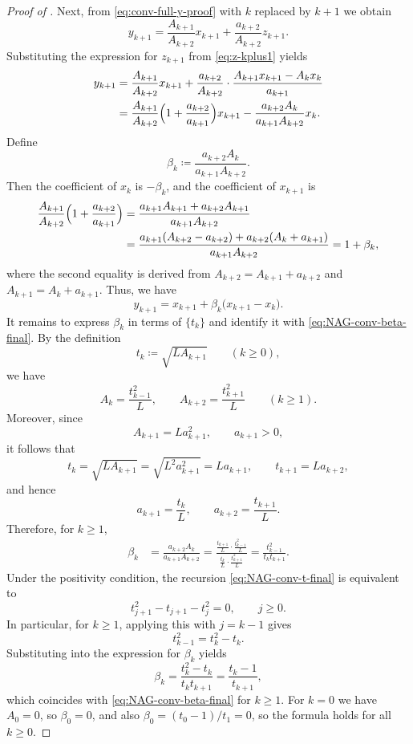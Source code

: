 \documentclass[10pt]{article}
\begin{document}
\begin{proof}[Proof of ]
Next, from \eqref{eq:conv-full-y-proof} with $k$ replaced by $k+1$ we obtain
\[
y_{k+1}
=
\frac{A_{k+1}}{A_{k+2}}x_{k+1}
+
\frac{a_{k+2}}{A_{k+2}}z_{k+1}.
\]
Substituting the expression for $z_{k+1}$ from \eqref{eq:z-kplus1} yields
\begin{align*}
y_{k+1}
&=
\frac{A_{k+1}}{A_{k+2}}x_{k+1}
+
\frac{a_{k+2}}{A_{k+2}}
\cdot
\frac{A_{k+1}x_{k+1}-A_k x_k}{a_{k+1}}\\
&=
\frac{A_{k+1}}{A_{k+2}}\Bigl(1+\frac{a_{k+2}}{a_{k+1}}\Bigr)x_{k+1}
-
\frac{a_{k+2}A_k}{a_{k+1}A_{k+2}}x_k.
\end{align*}
Define
\[
\beta_k \coloneqq \frac{a_{k+2}A_k}{a_{k+1}A_{k+2}}.
\]
Then the coefficient of $x_k$ is $-\beta_k$, and the coefficient of $x_{k+1}$ is
\begin{align*}
\frac{A_{k+1}}{A_{k+2}}\Bigl(1+\frac{a_{k+2}}{a_{k+1}}\Bigr)
& =
\frac{a_{k+1} A_{k+1}+a_{k+2}A_{k+1}}{a_{k+1} A_{k+2}}  \\
& =\frac{a_{k+1} (A_{k+2}-a_{k+2})+a_{k+2}(A_k+a_{k+1})}{a_{k+1} A_{k+2}} = 1+\beta_k,
\end{align*}
where the second equality is derived from 
 $A_{k+2}=A_{k+1}+a_{k+2}$ and $A_{k+1}=A_k+a_{k+1}$.
Thus, we have
\[
y_{k+1}
=
x_{k+1} + \beta_k\bigl(x_{k+1}-x_k\bigr).
\]
It remains to express $\beta_k$ in terms of $\{t_k\}$ and identify it with
\eqref{eq:NAG-conv-beta-final}.
By the definition
\[
t_k\coloneqq\sqrt{L A_{k+1}}
\qquad (k\ge 0),
\]
we have
\[
A_k=\frac{t_{k-1}^2}{L},
\qquad
A_{k+2}=\frac{t_{k+1}^2}{L}
\qquad (k\ge 1).
\]
Moreover, since
\[
A_{k+1}=La_{k+1}^2,
\qquad
a_{k+1}>0,
\]
it follows that
\[
t_k=\sqrt{L A_{k+1}}=\sqrt{L^2a_{k+1}^2}=La_{k+1},
\qquad
t_{k+1}=La_{k+2},
\]
and hence
\[
a_{k+1}=\frac{t_k}{L},
\qquad
a_{k+2}=\frac{t_{k+1}}{L}.
\]
Therefore, for $k\ge 1$,
\begin{align*}
\beta_k
&=
\frac{a_{k+2}A_k}{a_{k+1}A_{k+2}}
=
\frac{\displaystyle \frac{t_{k+1}}{L}\cdot\frac{t_{k-1}^2}{L}}
     {\displaystyle \frac{t_k}{L}\cdot\frac{t_{k+1}^2}{L}}
=
\frac{t_{k-1}^2}{t_k t_{k+1}}.
\end{align*}
Under the positivity condition, the recursion \eqref{eq:NAG-conv-t-final} is equivalent to
\[
t_{j+1}^2 - t_{j+1} - t_j^2 = 0,
\qquad j\ge 0.
\]
In particular, for $k\ge 1$, applying this with $j=k-1$ gives
\[
t_{k-1}^2 = t_k^2 - t_k.
\]
Substituting into the expression for $\beta_k$ yields
\[
\beta_k
=
\frac{t_k^2 - t_k}{t_k t_{k+1}}
=
\frac{t_k-1}{t_{k+1}},
\]
which coincides with \eqref{eq:NAG-conv-beta-final} for $k\ge 1$.
For $k=0$ we have $A_0=0$, so $\beta_0=0$, and also
\(\beta_0=(t_0-1)/t_1=0\), so the formula holds for all $k\ge 0$.


\end{proof}
\end{document}

